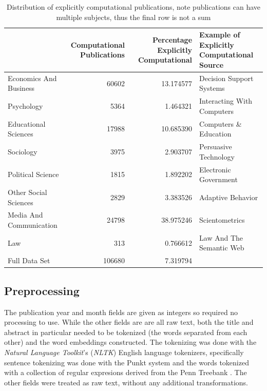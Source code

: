 \documentclass[12pt, a4paper]{article}
\begin{document}
\begin{table}[h]
	\centering
	\begin{adjustbox}{center}
		\begin{tabular}{lrrl}
			\toprule
			{} &  \pbox{20cm}{Computational\\ Publications} &  \pbox{20cm}{Percentage\\Explicitly Computational} &  \pbox{20cm}{Example of Explicitly\\Computational Source} \\
			\midrule
			Economics And Business  &           \num{60602} &        \num{13.174577} &    Decision Support Systems \\
			Psychology              &            \num{5364} &         \num{1.464321} &  Interacting With Computers \\
			Educational Sciences    &           \num{17988} &        \num{10.685390} &       Computers \& Education \\
			Sociology               &            \num{3975} &         \num{2.903707} &       Persuasive Technology \\
			Political Science       &            \num{1815} &         \num{1.892202} &       Electronic Government \\
			Other Social Sciences   &            \num{2829} &         \num{3.383526} &           Adaptive Behavior \\
			Media And Communication &           \num{24798} &        \num{38.975246} &              Scientometrics \\
			Law                     &             \num{313} &         \num{0.766612} &    Law And The Semantic Web \\
			\midrule
			Full Data Set           &          \num{106680} &         \num{7.319794} &   \\
			\bottomrule
		\end{tabular}
	\end{adjustbox}
	\caption{Distribution of explicitly computational publications, note publications can have multiple subjects, thus the final row is not a sum}\label{sum_comp}
\end{table}


\subsection{Preprocessing}

The publication year and month fields are given as integers so required no processing to use. While the other fields are are all raw text, both the title and abstract in particular needed to be tokenized (the words separated from each other) and the word embeddings constructed. The tokenizing was done with the \textit{Natural Language Toolkit}'s (\textit{NLTK}) \citep{bird2006nltk} English language tokenizers, specifically sentence tokenizing was done with the Punkt system \citep{kiss2006unsupervised} and the words tokenized with a collection of regular expresions derived from the Penn Treebank \citep{marcus1993building}. The other fields were treated as raw text, without any additional transformations.
\end{document}
